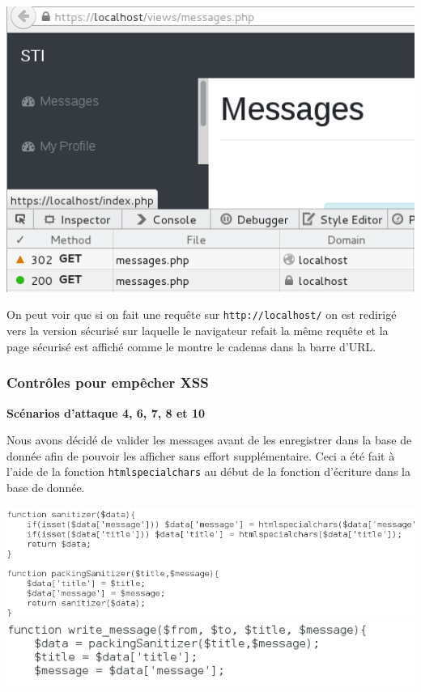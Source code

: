 \documentclass{article}
\begin{document}
\includegraphics{images/ssl1.png}

On peut voir que si on fait une requête sur \texttt{http://localhost/}
on est redirigé vers la version sécurisé sur laquelle le navigateur
refait la même requête et la page sécurisé est affiché comme le montre
le cadenas dans la barre d'URL.

\subsubsection{Contrôles pour empêcher XSS}

\textbf{Scénarios d'attaque 4, 6, 7, 8 et 10}

Nous avons décidé de valider les messages avant de les enregistrer dans
la base de donnée afin de pouvoir les afficher sans effort
supplémentaire. Ceci a été fait à l'aide de la fonction
\texttt{htmlspecialchars} au début de la fonction d'écriture dans la
base de donnée.

\includegraphics{images/sanitize.PNG}
\includegraphics{images/sanitize3.PNG}
\end{document}
